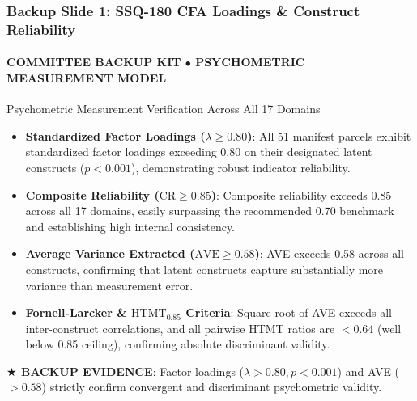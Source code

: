 \documentclass[aspectratio=169, 10pt]{beamer}
\newcommand{\leadbullet}[2]{\textbf{\color{NavyDark}#1}: \color{TextBody}#2}
\begin{document}
\begin{frame}
  \frametitle{Backup Slide 1: SSQ-180 CFA Loadings \& Construct Reliability}
  \framesubtitle{COMMITTEE BACKUP KIT $\bullet$ PSYCHOMETRIC MEASUREMENT MODEL}

  \begin{defensecard}{Psychometric Measurement Verification Across All 17 Domains}
    \begin{itemize}\setlength{\itemsep}{2.5pt}\setlength{\parskip}{0pt}\fontsize{8.2pt}{10.2pt}\selectfont
      \item \leadbullet{Standardized Factor Loadings ($\lambda \ge 0.80$)}{All 51 manifest parcels exhibit standardized factor loadings exceeding 0.80 on their designated latent constructs ($p < 0.001$), demonstrating robust indicator reliability.}
      \item \leadbullet{Composite Reliability ($\text{CR} \ge 0.85$)}{Composite reliability exceeds 0.85 across all 17 domains, easily surpassing the recommended 0.70 benchmark and establishing high internal consistency.}
      \item \leadbullet{Average Variance Extracted ($\text{AVE} \ge 0.58$)}{AVE exceeds 0.58 across all constructs, confirming that latent constructs capture substantially more variance than measurement error.}
      \item \leadbullet{Fornell-Larcker \& $\text{HTMT}_{0.85}$ Criteria}{Square root of AVE exceeds all inter-construct correlations, and all pairwise HTMT ratios are $< 0.64$ (well below 0.85 ceiling), confirming absolute discriminant validity.}
    \end{itemize}
  \end{defensecard}
  \vspace{-0.1cm}

  \begin{takeawaybanner}
    \textbf{\color{GoldPill}$\bigstar$ BACKUP EVIDENCE}: Factor loadings ($\lambda > 0.80, p < 0.001$) and AVE ($> 0.58$) strictly confirm convergent and discriminant psychometric validity.
  \end{takeawaybanner}
\end{frame}
\end{document}

